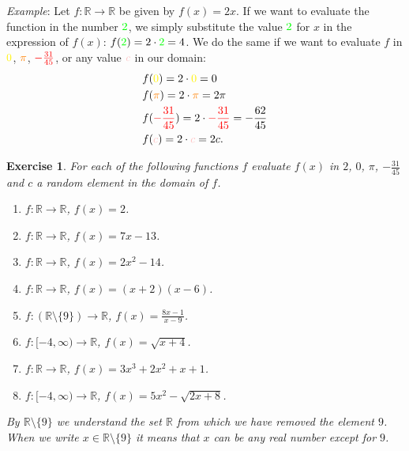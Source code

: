 \documentclass[12pt]{article}
\newtheorem{ex}{Exercise}[section]
\begin{document}
\textit{Example}: Let $f:\mathbb{R}\to \mathbb{R}$ be given by $f(x)=2x$. If we want to evaluate the function in the number $\textcolor{green}{2}$, we simply substitute the value $\textcolor{green}{2}$ for $x$ in the expression of $f(x)$: $f(\textcolor{green}{2})=2\cdot\textcolor{green}{ 2}=4$. We do the same if we want to evaluate $f$ in $\textcolor{yellow}{0}$, $\textcolor{orange}{\pi}$, $\textcolor{red}{-\frac{31}{45}}$, or any value $\textcolor{pink}{c}$ in our domain:
\begin{equation*}
\begin{split}
& f(\textcolor{yellow}{0})=2\cdot\textcolor{yellow}{0}=0\\
& f(\textcolor{orange}{\pi})=2\cdot\textcolor{orange}{\pi}=2\pi\\
& f(\textcolor{red}{-\frac{31}{45}})=2\cdot\textcolor{red}{-\frac{31}{45}}=-\frac{62}{45}\\
& f(\textcolor{pink}{c})=2\cdot\textcolor{pink}{c}=2c.
\end{split}
\end{equation*}

\begin{ex}\label{funct1}
For each of the following functions $f$ evaluate $f(x)$ in $2$, $0$, $\pi$, $-\frac{31}{45}$ and $c$ a random element in the domain of $f$.
\begin{enumerate}
\item[a)] $f:\mathbb{R}\to\mathbb{R}$, $f(x)=2$.
\item[b)] $f:\mathbb{R}\to\mathbb{R}$, $f(x)=7x-13$.
\item[c)] $f:\mathbb{R}\to\mathbb{R}$, $f(x)=2x^{2}-14$.
\item[d)] $f:\mathbb{R}\to\mathbb{R}$, $f(x)=(x+2)(x-6)$.
\item[e)] $f:(\mathbb{R}\setminus\{9\})\to\mathbb{R}$, $f(x)=\frac{8x-1}{x-9}$.
\item[f)] $f:[-4,\infty)\to\mathbb{R}$, $f(x)=\sqrt{x+4}$.
\item[g)] $f:\mathbb{R}\to\mathbb{R}$, $f(x)=3x^{3}+2x^{2}+x+1$.
\item[h)] $f:[-4,\infty)\to\mathbb{R}$, $f(x)=5x^{2}-\sqrt{2x+8}$.
\end{enumerate}
By $\mathbb{R}\setminus\{9\}$ we understand the set $\mathbb{R}$ from which we have removed the element $9$. When we write $x\in \mathbb{R}\setminus\{9\}$ it means that $x$ can be any real number except for $9$.
\end{ex}
\end{document}
